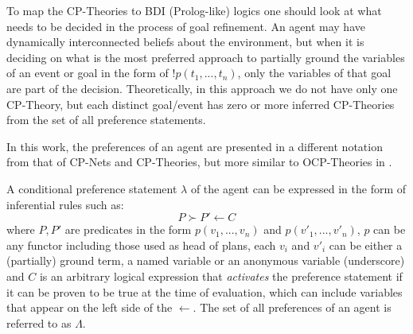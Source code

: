 \documentclass[sigconf,anonymous]{aamas}
\begin{document}

To map the CP-Theories to BDI (Prolog-like) logics one should look at what needs to be decided in the process of goal refinement. An agent may have dynamically interconnected beliefs about the environment, but when it is deciding on what is the most preferred approach to partially ground the variables of an event or goal in the form of $!p(t_1,...,t_n)$, only the variables of that goal are part of the decision. Theoretically, in this approach we do not have only one CP-Theory, but each distinct goal/event has zero or more inferred CP-Theories from the set of all preference statements. 

In this work, the preferences of an agent are presented in a different notation from that of CP-Nets and CP-Theories, but more similar to OCP-Theories in \cite{DiNoia2015}.

A conditional preference statement $\lambda$ of the agent can be expressed in the form of inferential rules such as:
\begin{equation*}
    P \succ P' \leftarrow C
\end{equation*}
where $P,P'$ are predicates in the form $p(v_1,...,v_n)$ and $p(v'_1,...,v'_n)$,  $p$ can be any functor including those used as head of plans, each $v_i$ and $v'_i$ can be either a (partially) ground term, a named variable or an anonymous variable (underscore) and $C$ is an arbitrary logical expression that \textit{activates} the preference statement if it can be proven to be true at the time of evaluation, which can include variables that appear on the left side of the $\leftarrow$. The set of all preferences of an agent is referred to as $\Lambda$.
\end{document}
